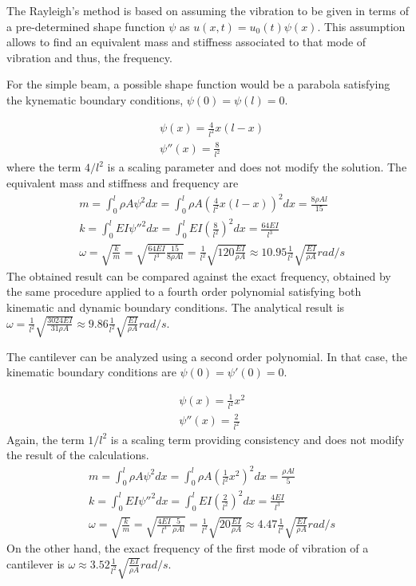 The Rayleigh's method is based on assuming the vibration to be given in terms of a pre-determined shape function $\psi$ as $u(x,t) = u_0(t)\psi(x)$. This assumption allows to find an equivalent mass and stiffness associated to that mode of vibration and thus, the frequency.

\parbox{.7\textwidth}{For the simple beam, a possible shape function would be a parabola satisfying the kynematic boundary conditions, $\psi(0) = \psi(l) = 0$.} \hspace{1em}
\parbox{.25\textwidth}{}
\begin{align*}
&\psi(x) = \frac{4}{l^2} x (l-x) \\
&\psi''(x) = \frac{8}{l^2}
\end{align*}
where the term $4/l^2$ is a scaling parameter and does not modify the solution. The equivalent mass and stiffness and frequency are
\begin{align*}
&m = \int_0^l \rho A\psi^2dx = \int_0^l \rho A \left(\frac{4}{l^2} x (l-x)\right)^2dx = \frac{8\rho Al}{15} \\
&k = \int_0^l EI \psi''^2 dx = \int_0^l EI \left(\frac{8}{l^2}\right)^2dx = \frac{64EI}{l^3} \\
&\omega = \sqrt{\frac{k}{m}} = \sqrt{\frac{64EI}{l^3}\frac{15}{8\rho Al}} = \frac{1}{l^2}\sqrt{120\frac{EI}{\rho A}} \approx 10.95\frac{1}{l^2}\sqrt{\frac{EI}{\rho A}} rad/s
\end{align*}
The obtained result can be compared against the exact frequency, obtained by the same procedure applied to a fourth order polynomial satisfying both kinematic and dynamic boundary conditions. The analytical result is $\omega = \frac{1}{l^2}\sqrt{\frac{3024EI}{31\rho A}} \approx 9.86\frac{1}{l^2}\sqrt{\frac{EI}{\rho A}} rad/s$.

\parbox{.7\textwidth}{The cantilever can be analyzed using a second order polynomial. In that case, the kinematic boundary conditions are $\psi(0) = \psi'(0) = 0$.} \hspace{1em}
\parbox{.25\textwidth}{}
\begin{align*}
&\psi(x) = \frac{1}{l^2} x^2 \\
&\psi''(x) = \frac{2}{l^2}
\end{align*}
Again, the term $1/l^2$ is a scaling term providing consistency and does not modify the result of the calculations.
\begin{align*}
&m = \int_0^l \rho A\psi^2dx = \int_0^l \rho A \left(\frac{1}{l^2} x^2\right)^2dx = \frac{\rho Al}{5} \\
&k = \int_0^l EI \psi''^2 dx = \int_0^l EI \left(\frac{2}{l^2}\right)^2dx = \frac{4EI}{l^3} \\
&\omega = \sqrt{\frac{k}{m}} = \sqrt{\frac{4EI}{l^3}\frac{5}{\rho Al}} = \frac{1}{l^2}\sqrt{20\frac{EI}{\rho A}} \approx 4.47\frac{1}{l^2}\sqrt{\frac{EI}{\rho A}} rad/s
\end{align*}
On the other hand, the exact frequency of the first mode of vibration of a cantilever is $\omega\approx3.52\frac{1}{l^2}\sqrt{\frac{EI}{\rho A}}rad/s$.

